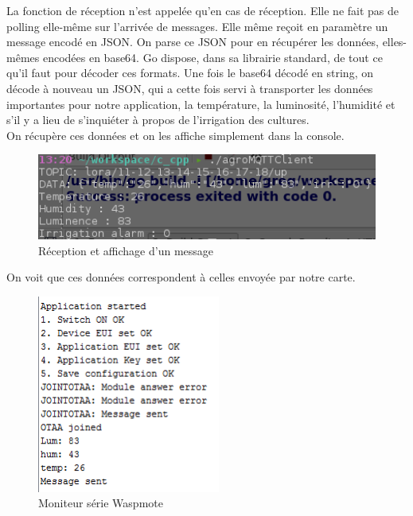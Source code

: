 La fonction de réception n'est appelée qu'en cas de réception. Elle ne fait pas de polling elle-même sur l'arrivée de messages. Elle même reçoit en paramètre un message encodé en JSON. On parse ce JSON pour en récupérer les données, elles-mêmes encodées en base64. Go dispose, dans sa librairie standard, de tout ce qu'il faut pour décoder ces formats. Une fois le base64 décodé en string, on décode à nouveau un JSON, qui a cette fois servi à transporter les données importantes pour notre application, la température, la luminosité, l'humidité et s'il y a lieu de s'inquiéter à propos de l'irrigation des cultures. \\

On récupère ces données et on les affiche simplement dans la console.
\begin{figure}[H]
	\begin{center}
		\includegraphics[width=12cm]{img/app_output.png}
		\caption{Réception et affichage d'un message}
		\label{app_output}
	\end{center}
\end{figure}
On voit que ces données correspondent à celles envoyée par notre carte.
\begin{figure}[H]
	\begin{center}
		\includegraphics[width=6cm]{img/console.png}
		\caption{Moniteur série Waspmote}
		\label{result}
	\end{center}
\end{figure}